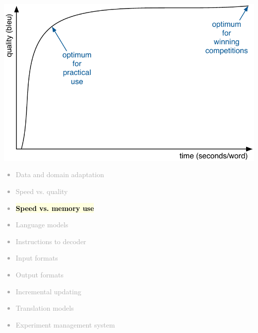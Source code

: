 \documentclass[landscape]{uedslides2C}
\newcommand{\currenttopic}[1]{\colorbox{lightyellow}{\textcolor{black}{\bf #1}}}
\begin{document}

\vspace{5mm}
\begin{center} 
\includegraphics[scale=1.4]{quality-vs-speed.pdf}\vspace{-20mm}
\end{center}


\vspace{-5mm}
\textcolor{darkgrey}{
\begin{itemize} \itemsep -1mm
\item Data and domain adaptation
\item Speed vs. quality
\item \currenttopic{Speed vs. memory use}
\item Language models
\item Instructions to decoder
\item Input formats
\item Output formats
\item Incremental updating
\item Translation models
\item Experiment management system
\end{itemize}
}

\end{document}
